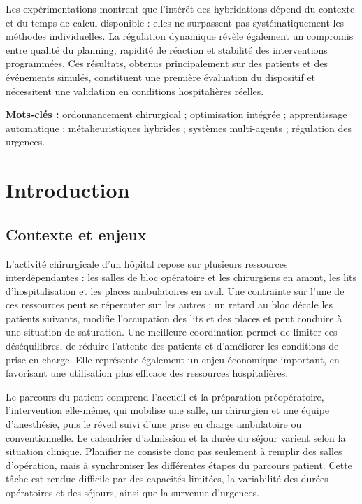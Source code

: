 \documentclass[11pt,a4paper]{article}
\begin{document}
Les expérimentations montrent que l'intérêt des hybridations dépend du contexte et du temps de calcul disponible : elles ne surpassent pas systématiquement les méthodes individuelles. La régulation dynamique révèle également un compromis entre qualité du planning, rapidité de réaction et stabilité des interventions programmées. Ces résultats, obtenus principalement sur des patients et des événements simulés, constituent une première évaluation du dispositif et nécessitent une validation en conditions hospitalières réelles.

\medskip
\noindent\textbf{Mots-clés :} ordonnancement chirurgical ; optimisation intégrée ; apprentissage automatique ; métaheuristiques hybrides ; systèmes multi-agents ; régulation des urgences.

\clearpage
\begingroup{}\setlength{\cftbeforesecskip}{0pt}\enlargethispage{5\baselineskip}
\tableofcontents
\endgroup
\clearpage


\section{Introduction}
\label{sec:intro}

\subsection{Contexte et enjeux}

L'activité chirurgicale d'un hôpital repose sur plusieurs ressources interdépendantes : les salles de bloc opératoire et les chirurgiens en amont, les lits d'hospitalisation et les places ambulatoires en aval. Une contrainte sur l'une de ces ressources peut se répercuter sur les autres : un retard au bloc décale les patients suivants, modifie l'occupation des lits et des places et peut conduire à une situation de saturation. Une meilleure coordination permet de limiter ces déséquilibres, de réduire l'attente des patients et d'améliorer les conditions de prise en charge. Elle représente également un enjeu économique important, en favorisant une utilisation plus efficace des ressources hospitalières.

Le parcours du patient comprend l'accueil et la préparation préopératoire, l'intervention elle-même, qui mobilise une salle, un chirurgien et une équipe d'anesthésie, puis le réveil suivi d'une prise en charge ambulatoire ou conventionnelle. Le calendrier d'admission et la durée du séjour varient selon la situation clinique. Planifier ne consiste donc pas seulement à remplir des salles d'opération, mais à synchroniser les différentes étapes du parcours patient. Cette tâche est rendue difficile par des capacités limitées, la variabilité des durées opératoires et des séjours, ainsi que la survenue d'urgences.
\end{document}
